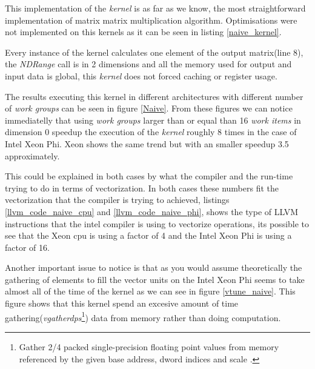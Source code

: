 \par{This implementation of the \emph{kernel} is as far as we know, the most straightforward implementation of 
    matrix matrix multiplication algorithm. Optimisations were not implemented on this kernels as it can be seen in 
    listing \ref{naive_kernel}.} 
    
\par{Every instance of the kernel calculates one element of the output matrix(line 8), 
    the \emph{NDRange} call is in 2 dimensions and all the memory used for output and input data is global, this \emph{kernel}
    does not forced caching or register usage.}



\par{The results executing this kernel in different architectures with different number of \emph{work groups } can be seen 
in figure \ref{Naive}. From these figures we can notice immediatelly that using \emph{work groups} larger than or equal than 16
\emph{work items} in dimension 0 speedup the execution of the \emph{kernel} roughly 8 times in the case of Intel Xeon Phi.
Xeon shows the same trend but with an smaller speedup 3.5 approximately.}





\par{This could be explained in both cases by what the compiler and the run-time trying to do in terms of vectorization. In both 
cases these numbers fit the vectorization that the compiler is trying to achieved, listings 
\ref{llvm_code_naive_cpu} and \ref{llvm_code_naive_phi}, shows the type of LLVM instructions that the intel compiler is using to 
vectorize operations, its possible to see that the Xeon cpu is using a factor of 4 and the Intel Xeon Phi is using a factor of 16.}

\par{Another important issue to notice is that as you would assume theoretically the gathering of elements to fill the vector 
    units on the Intel Xeon Phi seems to take almost all of the time of the kernel as we can see in figure \ref{vtune_naive}. This 
    figure shows that this kernel spend an excesive amount of time gathering(\emph{vgatherdps}\footnote{Gather 2/4 packed 
    single-precision floating point values from memory referenced by the given base address, dword indices and scale 
    \cite{intrinsics}.}) data from memory rather than doing computation.}

